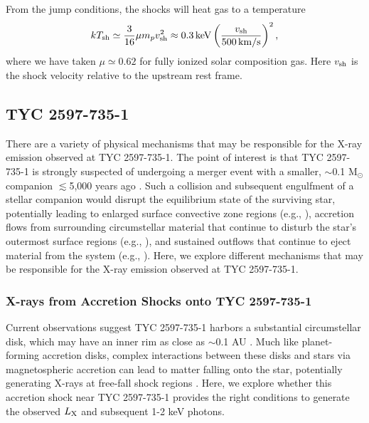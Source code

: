 \documentclass[]{aastex631}
\newcommand{\be}{\begin{equation}}
\newcommand{\ee}{\end{equation}}
\begin{document}
From the jump conditions, the shocks will heat gas to a temperature
\be
kT_{\rm sh} \simeq \frac{3}{16}\mu m_p v_{\rm sh}^{2} \approx 0.3\,{\rm keV}\left(\frac{v_{\rm sh}}{500\,{\rm km/s}}\right)^{2},
\label{eqn:Tshock}
\ee
where we have taken $\mu \simeq 0.62$ for fully ionized solar composition gas.  Here $v_{\rm sh}$ is the shock velocity relative to the upstream rest frame.

\subsection{TYC 2597-735-1}
There are a variety of physical mechanisms that may be responsible for the X-ray emission observed at TYC 2597-735-1. The point of interest is that TYC 2597-735-1 is strongly suspected of undergoing a merger event with a smaller, $\sim$0.1 M$_{\odot}$ companion $\lesssim$5,000 years ago \citep{2020Natur.587..387H}. Such a collision and subsequent engulfment of a stellar companion would disrupt the equilibrium state of the surviving star, potentially leading to enlarged surface convective zone regions (e.g., \citealt{}), accretion flows from surrounding circumstellar material that continue to disturb the star's outermost surface regions (e.g., \citealt{}), and sustained outflows that continue to eject material from the system (e.g., \citealt{Zuckerman+2008}). Here, we explore different mechanisms that may be responsible for the X-ray emission observed at TYC 2597-735-1.


\subsubsection{X-rays from Accretion Shocks onto TYC 2597-735-1}

Current observations suggest TYC 2597-735-1 harbors a substantial circumstellar disk, which may have an inner rim as close as $\sim$0.1 AU \citep{2020Natur.587..387H}. Much like planet-forming accretion disks, complex interactions between these disks and stars via magnetospheric accretion can lead to matter falling onto the star, potentially generating X-rays at free-fall shock regions \citep[e.g.]{2007A&A...466.1111G}. Here, we explore whether this accretion shock near TYC 2597-735-1 provides the right conditions to generate the observed $L_{\rm X}$ and subsequent 1-2 keV photons.
\end{document}

